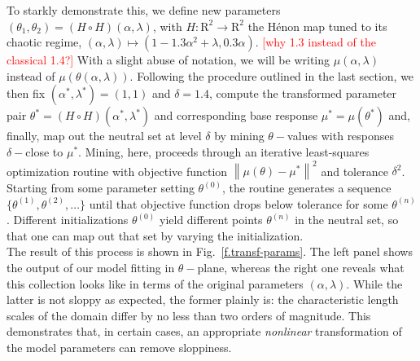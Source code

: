 \documentclass{article}
\newcommand{\p}{\theta}
\newcommand{\omr}{\mu}
\newcommand{\R}{\mathrm{R}}
\begin{document}
To starkly demonstrate this, we define new parameters $(\p_1,\p_2) =
(H \circ H)(\alpha,\lambda)$, with $H : \R^2 \to \R^2$ the H\'enon map
tuned to its chaotic regime, $(\alpha, \lambda) \mapsto (1 - 1.3 \alpha^2 + \lambda , 0.3 \alpha)$.
\textcolor{red}{[why 1.3 instead of the classical 1.4?]}
With a slight abuse of notation, we will be writing $\omr(\alpha, \lambda)$ instead of $\omr(\p(\alpha, \lambda))$.
Following the procedure outlined in the last section, we then fix $(\alpha^*,\lambda^*) = (1,1)$ and $\delta = 1.4$, compute the transformed parameter pair $\p^* = (H \circ H)(\alpha^*,\lambda^*)$ and corresponding base response $\omr^* = \omr(\p^*)$ and, finally, map out the neutral set at level $\delta$ by mining $\p-$values with responses $\delta-$close to $\omr^*$.
Mining, here, proceeds through an iterative least-squares optimization routine with objective function $\left\| \omr(\p) - \omr^* \right\|^2$ and tolerance $\delta^2$.
Starting from some parameter setting $\p^{(0)}$, the routine generates a sequence $\{\p^{(1)},\p^{(2)},\ldots\}$ until that objective function drops below tolerance for some $\p^{(n)}$.
Different initializations $\p^{(0)}$ yield different points $\p^{(n)}$ in the neutral set, so that one can map out that set by varying the initialization.\\

The result of this process is shown in Fig.~\ref{f.transf-params}.
The left panel shows the output of our model fitting in $\p-$plane, whereas
the right one reveals what this collection looks like in terms of the original parameters $(\alpha,\lambda)$.
While the latter is not sloppy as expected, the former plainly is: the characteristic length scales of the domain differ by no less than two orders of magnitude.
This demonstrates that, in certain cases, an appropriate \emph{nonlinear} transformation of the model parameters can remove sloppiness.
\end{document}
